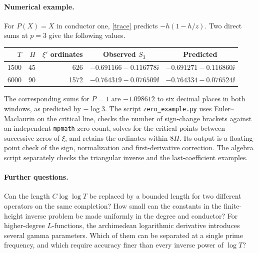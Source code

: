 \documentclass[11pt,letterpaper]{article}
\begin{document}
\paragraph{Numerical example.}
For $P(X)=X$ in conductor one, \eqref{trace} predicts
$-h(1-h/z)$. Two direct sums at $p=3$ give the following values.
\begin{center}\small
\begin{tabular}{rrrrl}
\toprule
$T$ & $H$ & $\xi'$ ordinates & \multicolumn{1}{c}{Observed $S_3$} &
\multicolumn{1}{c}{Predicted} \\
\midrule
1500&45&626& $-0.691166-0.116778\ii$ & $-0.691271-0.116860\ii$ \\
6000&90&1572& $-0.764319-0.076509\ii$ & $-0.764334-0.076524\ii$ \\
\bottomrule
\end{tabular}
\end{center}
The corresponding sums for $P=1$ are $-1.098612$ to six decimal places
in both windows, as predicted by $-\log 3$. The script
\texttt{zero\_example.py} uses Euler--Maclaurin on the critical line,
checks the number of sign-change brackets against an independent
\texttt{mpmath} zero count, solves for the critical points between
successive zeros of $\xi$, and retains the ordinates within $8H$.
Its output is a floating-point check of the sign, normalization and
first-derivative correction. The algebra script separately checks the
triangular inverse and the last-coefficient examples.

\paragraph{Further questions.}
Can the length $C\log\log T$ be replaced by a bounded length for
two different operators on the same completion? How small can the
constants in the finite-height inverse problem be made uniformly in
the degree and conductor? For higher-degree $L$-functions, the
archimedean logarithmic derivative introduces several gamma parameters.
Which of them can be separated at a single prime frequency, and which
require accuracy finer than every inverse power of $\log T$?
\end{document}
